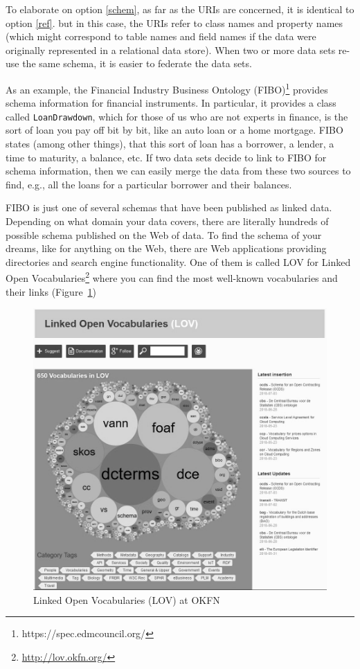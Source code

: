 To elaborate on option \ref{schem}, as far as the URIs are concerned, it is identical to option \ref{ref}. 
but in this case, the URIs refer to class names and property names (which might correspond to table names and field names 
if the data were originally represented in a relational data store).  
When two or more data sets re-use the same schema, it is easier to federate the data sets.  

As an example, the Financial Industry Business Ontology (FIBO)\footnote{https://spec.edmcouncil.org/} provides 
schema information for financial instruments.  In particular, it provides a class called \texttt{LoanDrawdown}, which 
for those of us who are not experts in finance, is the sort of loan you pay off bit by bit, like an auto loan or a home 
mortgage. 
FIBO states (among other things), that this sort of loan has a borrower, a lender, a time to maturity, a balance, etc. If 
two data sets decide to link to FIBO for schema information, then we can easily merge the data from these two sources to 
find, e.g., all the loans for a particular borrower and their balances. 

FIBO is just one of several schemas that have been published as linked data.  Depending on what domain 
your data covers, there are literally hundreds of possible schema published on the Web of data. 
To find the schema of your dreams, like for anything on the Web, there
are Web applications providing directories and search engine
functionality. One of them is called LOV for Linked Open
Vocabularies\footnote{\url{http://lov.okfn.org/}} where you can find the
most well-known vocabularies and their links (Figure~\ref{fig:ch5.12})

\begin{figure}
    \centering
\includegraphics[width=5.0in]{media/ch5/figure-05-12.jpg}
    \caption{Linked Open Vocabularies (LOV) at OKFN}
    \label{fig:ch5.12}
\end{figure}

